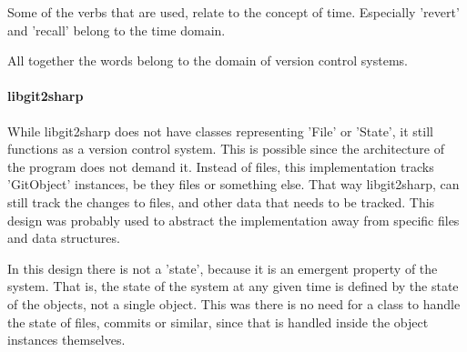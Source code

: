 Some of the verbs that are used, relate to the concept of time.
Especially 'revert' and 'recall' belong to the time domain.

All together the words belong to the domain of version control systems.

\paragraph{libgit2sharp}
While libgit2sharp does not have classes representing 'File' or 'State', it still functions as a version control system.
This is possible since the architecture of the program does not demand it.
Instead of files, this implementation tracks 'GitObject' instances, be they files or something else.
That way libgit2sharp, can still track the changes to files, and other data that needs to be tracked.
This design was probably used to abstract the implementation away from specific files and data structures.

In this design there is not a 'state', because it is an emergent property of the system.
That is, the state of the system at any given time is defined by the state of the objects, not a single object.
This was there is no need for a class to handle the state of files, commits or similar, since that is handled inside the object instances themselves.



